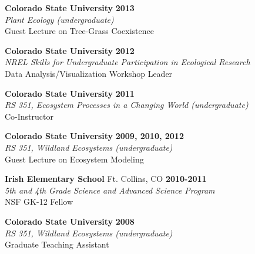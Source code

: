 \documentclass[margin,line]{resume}
\begin{document}
\begin{resume}
                     \newpage{}
    
    \textbf{Colorado State University} \hfill \textbf{2013}\\
               \textsl{Plant Ecology (undergraduate)}\\
               Guest Lecture on Tree-Grass Coexistence
               
    \textbf{Colorado State University} \hfill \textbf{2012}\\ 
               \textsl{NREL Skills for Undergraduate Participation in Ecological Research}\\
               Data Analysis/Visualization Workshop Leader
               		
    \textbf{Colorado State University} \hfill \textbf{2011}\\ 
               \textsl{RS 351, Ecosystem Processes in a Changing World (undergraduate)}\\
               Co-Instructor 

    \textbf{Colorado State University} \hfill \textbf{2009, 2010, 2012}\\ 
               \textsl{RS 351, Wildland Ecosystems (undergraduate)}\\
               Guest Lecture on Ecosystem Modeling
               
    \textbf{Irish Elementary School} Ft. Collins, CO \hfill \textbf{2010-2011}\\ 
   		\textsl{5th and 4th Grade Science and Advanced Science Program}\\
		NSF GK-12 Fellow
		
     \textbf{Colorado State University} \hfill \textbf{2008}\\ 
               \textsl{RS 351, Wildland Ecosystems (undergraduate)}\\
               Graduate Teaching Assistant 

\end{resume}
\end{document}
